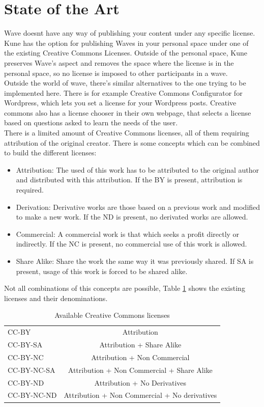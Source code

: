\section{State of the Art}
\label{subsec:cc_soa}
Wave doesnt have any way of publishing your content under any specific license. Kune has the option for publishing Waves in your personal space under one of the existing Creative Commons Licenses. Outside of the personal space, Kune preserves Wave's aspect and removes the space where the license is in the personal space, so no license is imposed to other participants in a wave.\\[.2cm]
Outside the world of wave, there's similar alternatives to the one trying to be implemented here. There is for example Creative Commons Configurator for Wordpress, which lets you set a license for your Wordpress posts. Creative commons also has a license chooser \cite{ref:cc_chooser} in their own webpage, that selects a license based on questions asked to learn the needs of the user.\\[.2cm]
There is a limited amount of Creative Commons licenses, all of them requiring attribution of the original creator. There is some concepts which can be combined to build the different licenses:
\begin{itemize}
  \item Attribution: The used of this work has to be attributed to the original author and distributed with this attribution. If the BY is present, attribution is required.
  \item Derivation: Derivative works are those based on a previous work and modified to make a new work. If the ND is present, no derivated works are allowed.
  \item Commercial: A commercial work is that which seeks a profit directly or indirectly. If the NC is present, no commercial use of this work is allowed.
  \item Share Alike: Share the work the same way it was previously shared. If SA is present, usage of this work is forced to be shared alike.
\end{itemize}
Not all combinations of this concepts are possible, Table \ref{fig:cc_licenses} shows the existing licenses and their denominations.
\begin{table}[H]
  \begin{center}
    \begin{tabular}{ | l | c |}
      \hline
      CC-BY & Attribution\\
      CC-BY-SA & Attribution + Share Alike\\
      CC-BY-NC & Attribution + Non Commercial\\
      CC-BY-NC-SA & Attribution + Non Commercial + Share Alike\\
      CC-BY-ND & Attribution + No Derivatives\\
      CC-BY-NC-ND & Attribution + Non Commercial + No derivatives\\
      \hline
    \end{tabular}
  \end{center}
  \caption{Available Creative Commons licenses}
  \label{fig:cc_licenses}
\end{table}
